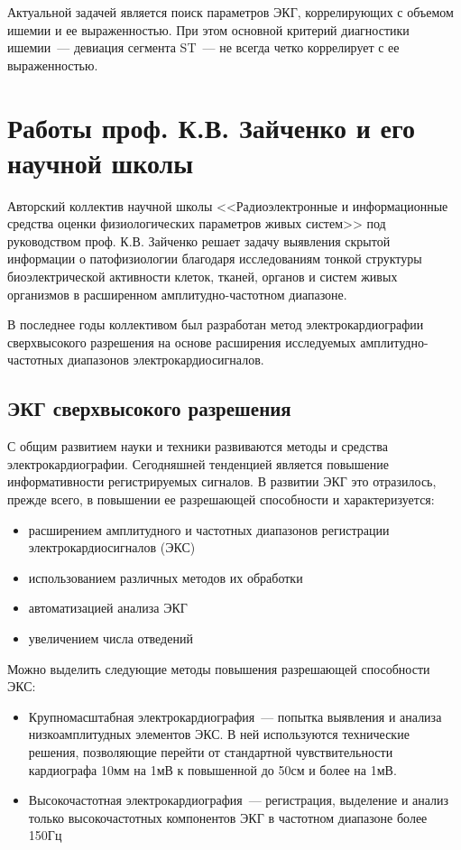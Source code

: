 \documentclass[a4paper,12pt]{extarticle}
\begin{document}
Актуальной задачей является поиск параметров ЭКГ, коррелирующих с объемом ишемии и ее выраженностью. При этом основной критерий диагностики ишемии~--- девиация сегмента ST~--- не всегда четко коррелирует с ее выраженностью.

\section{Работы проф. К.В. Зайченко и его научной школы}

Авторский коллектив научной школы <<Радиоэлектронные и информационные средства оценки физиологических параметров живых систем>> под руководством проф. К.В. Зайченко решает задачу выявления скрытой информации о патофизиологии благодаря исследованиям тонкой структуры биоэлектрической активности клеток, тканей, органов и систем живых организмов в расширенном амплитудно-частотном диапазоне.

В последнее годы коллективом был разработан метод электрокардиографии сверхвысокого разрешения на основе расширения исследуемых амплитудно-частотных диапазонов электрокардиосигналов.

\subsection{ЭКГ сверхвысокого разрешения}


С общим развитием науки и техники развиваются методы и средства электрокардиографии. Сегодняшней тенденцией является повышение информативности регистрируемых сигналов. В развитии ЭКГ это отразилось, прежде всего, в повышении ее разрешающей способности и характеризуется:

\begin{itemize}
    \item расширением амплитудного и частотных диапазонов регистрации электрокардиосигналов (ЭКС)
    \item использованием различных методов их обработки
    \item автоматизацией анализа ЭКГ
    \item увеличением числа отведений
\end{itemize}

Можно выделить следующие методы повышения разрешающей способности ЭКС:
\begin{itemize}
    \item Крупномасштабная электрокардиография~--- попытка выявления и анализа низкоамплитудных элементов ЭКС. В ней используются технические решения, позволяющие перейти от стандартной чувствительности кардиографа 10мм на 1мВ к повышенной до 50см и более на 1мВ.
    \item Высокочастотная электрокардиография~--- регистрация, выделение и анализ только высокочастотных компонентов ЭКГ в частотном диапазоне более 150Гц
\end{itemize}
\end{document}
